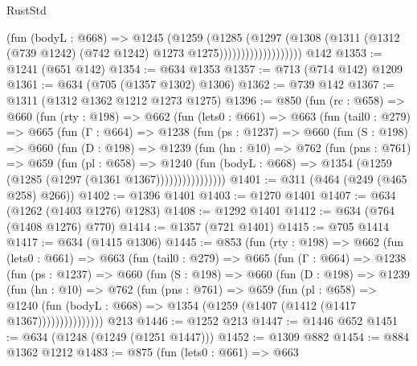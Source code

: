 \begin{lexlean}{RustStd}
\begin{coremodule}
{\begin{coremodule}
{{{{{{{{                            (fun (bodyL : @668) =>
                            @1245
                              (@1259
                                (@1285
                                  (@1297
                                    (@1308
                                      (@1311
                                        (@1312
                                          (@739 @1242)
                                          (@742 @1242)
                                          @1273
                                          @1275)))))))))))))))))))
    @142
@1353 := @1241 (@651 @142)
@1354 := @634 @1353
@1357 := @713 (@714 @142) @1209
@1361 := @634 (@705 (@1357 @1302) @1306)
@1362 := @739 @142
@1367 := @1311 (@1312 @1362 @1212 @1273 @1275)
@1396 := @850
    (fun (rc : @658) =>
    @660
      (fun (rty : @198) =>
      @662
        (fun (lets0 : @661) =>
        @663
          (fun (tail0 : @279) =>
          @665
            (fun (Γ : @664) =>
            @1238
              (fun (ps : @1237) =>
              @660
                (fun (S : @198) =>
                @660
                  (fun (D : @198) =>
                  @1239
                    (fun (hn : @10) =>
                    @762
                      (fun (pns : @761) =>
                      @659
                        (fun (pl : @658) =>
                        @1240
                          (fun (bodyL : @668) =>
                          @1354 (@1259 (@1285 (@1297 (@1361 @1367))))))))))))))))
@1401 := @311 (@464 (@249 (@465 @258) @266))
@1402 := @1396 @1401
@1403 := @1270 @1401
@1407 := @634 (@1262 (@1403 @1276) @1283)
@1408 := @1292 @1401
@1412 := @634 (@764 (@1408 @1276) @770)
@1414 := @1357 (@721 @1401)
@1415 := @705 @1414
@1417 := @634 (@1415 @1306)
@1445 := @853
    (fun (rty : @198) =>
    @662
      (fun (lets0 : @661) =>
      @663
        (fun (tail0 : @279) =>
        @665
          (fun (Γ : @664) =>
          @1238
            (fun (ps : @1237) =>
            @660
              (fun (S : @198) =>
              @660
                (fun (D : @198) =>
                @1239
                  (fun (hn : @10) =>
                  @762
                    (fun (pns : @761) =>
                    @659
                      (fun (pl : @658) =>
                      @1240
                        (fun (bodyL : @668) =>
                        @1354 (@1259 (@1407 (@1412 (@1417 @1367)))))))))))))))
    @213
@1446 := @1252 @213
@1447 := @1446 @652
@1451 := @634 (@1248 (@1249 (@1251 @1447)))
@1452 := @1309 @882
@1454 := @884 @1362 @1212
@1483 := @875
    (fun (lets0 : @661) =>
    @663
}}}}}}}}
\end{coremodule}}
\end{coremodule}
\end{lexlean}
